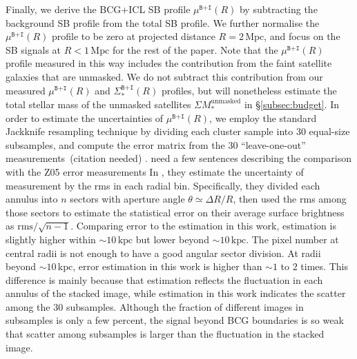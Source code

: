 \documentclass[fleqn,usenatbib]{mnras}
\newcommand{\sigbi}{\Sigma_*^{\texttt{B+I}}}
\newcommand{\mubi}{\mu^{\texttt{B+I}}}
\newcommand{\mpc}{\mathrm{Mpc}}
\newcommand{\kpc}{\mathrm{kpc}}
\newcommand\ying[1]{{\color{red} {#1}}}
\newcommand\xkchen[1]{{\color{cyan} {#1}}}
\newcommand*\citeme{{\color{green}(citation needed)}}
\begin{document}
Finally, we derive the BCG+ICL SB profile $\mubi(R)$ by subtracting the
background SB profile from the total SB profile. We further normalise the
$\mubi(R)$ profile to be zero at projected distance $R{=}2\,\mpc$, and
focus on the SB signals at $R{<}1\,\mpc$ for the rest of the paper. Note
that the $\mubi(R)$ profile measured in this way includes the contribution
from the faint satellite galaxies that are unmasked. We do not subtract
this contribution from our measured $\mubi(R)$ and $\sigbi(R)$ profiles,
but will nonetheless estimate the total stellar mass of the unmasked
satellites $\Sigma M_*^{\mathrm{unmasked}}$ in \S\ref{subsec:budget}.  In
order to estimate the uncertainties of $\mubi(R)$, we employ the standard
Jackknife resampling technique by dividing each cluster sample into 30
equal-size subsamples, and compute the error matrix from the 30
``leave-one-out'' measurements~\citeme \xkchen{\citep{Efron1981, Efron1982} }. \ying{need a few sentences
describing the comparison with the Z05 error measurements}
\xkchen{In , they estimate the uncertainty of measurement by the rms in each radial bin. Specifically, they divided each annulus into $n$ sectors with aperture angle $\theta\simeq\Delta R /R$, then used the rms among those sectors to estimate the statistical error on their average surface brightness as $\mathrm{rms}/\sqrt{n-1}$. Comparing \citetalias{Zibetti2005} error to the estimation in this work, \citetalias{Zibetti2005} estimation is slightly higher within ${\sim}10\,\kpc$ but lower beyond ${\sim}10\,\kpc$. The pixel number at central radii is not enough to have a good angular sector division. At radii beyond ${\sim}10\,\kpc$, error estimation in this work is higher than \citetalias{Zibetti2005} ${\sim}1$ to $2$ times. This difference is mainly because that \citetalias{Zibetti2005} estimation reflects the fluctuation in each annulus of the stacked image, while estimation in this work indicates the scatter among the 30 subsamples. Although the fraction of different images in subsamples is only a few percent, the signal beyond BCG boundaries is so weak that scatter among subsamples is larger than the fluctuation in the stacked image.}
\end{document}
